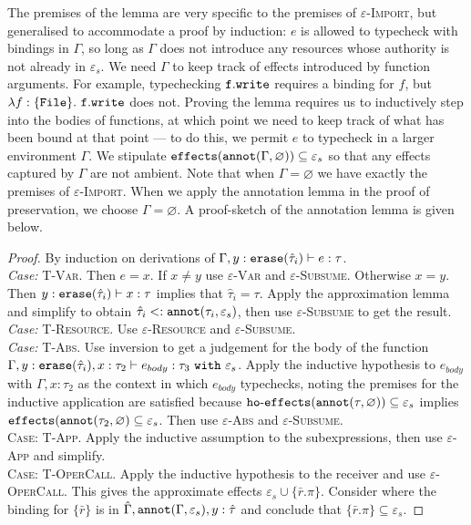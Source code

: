 The premises of the lemma are very specific to the premises of \textsc{$\varepsilon$-Import}, but generalised to accommodate a proof by induction: $e$ is allowed to typecheck with bindings in $\Gamma$, so long as $\Gamma$ does not introduce any resources whose authority is not already in $\varepsilon_s$. We need $\Gamma$ to keep track of effects introduced by function arguments. For example, typechecking $\mathtt{f.write}$ requires a binding for $f$, but $\lambda f: \{\mathtt{File}\}.~\mathtt{f.write}$ does not. Proving the lemma requires us to inductively step into the bodies of functions, at which point we need to keep track of what has been bound at that point --- to do this, we permit $e$ to typecheck in a larger environment $\Gamma$. We stipulate $\mathtt{effects}(\mathtt{annot}(\Gamma, \varnothing)) \subseteq \varepsilon_s$ so that any effects captured by $\Gamma$ are not ambient. Note that when $\Gamma = \varnothing$ we have exactly the premises of \textsc{$\varepsilon$-Import}. When we apply the annotation lemma in the proof of preservation, we choose $\Gamma = \varnothing$. A proof-sketch of the annotation lemma is given below.

\begin{proof}
By induction on derivations of $\Gamma, y: \mathtt{erase}(\hat \tau_i) \vdash e: \tau$.\\

\textit{Case:} \textsc{T-Var}. Then $e = x$. If $x \neq y$ use \textsc{$\varepsilon$-Var} and \textsc{$\varepsilon$-Subsume}. Otherwise $x = y$. Then $y: \mathtt{erase}(\hat \tau_i) \vdash x: \tau$ implies that $\hat \tau_i = \tau$. Apply the approximation lemma and simplify to obtain $\hat \tau_i <: \mathtt{annot}(\tau_i, \varepsilon_s)$, then use \textsc{$\varepsilon$-Subsume} to get the result.\\

\textit{Case:} \textsc{T-Resource}. Use \textsc{$\varepsilon$-Resource} and \textsc{$\varepsilon$-Subsume}.\\

\textit{Case:} \textsc{T-Abs}. Use inversion to get a judgement for the body of the function $\Gamma, y: \mathtt{erase}(\hat \tau_i), x: \tau_2 \vdash e_{body}: \tau_3~\mathtt{with}~ \varepsilon_s$. Apply the inductive hypothesis to $e_{body}$ with $\Gamma, x: \tau_2$ as the context in which $e_{body}$ typechecks, noting the premises for the inductive application are satisfied because $\mathtt{ho \hbox{-} effects}(\mathtt{annot}(\tau, \varnothing)) \subseteq \varepsilon_s$ implies $\mathtt{effects}(\mathtt{annot}(\tau_2, \varnothing) \subseteq \varepsilon_s$. Then use \textsc{$\varepsilon$-Abs} and \textsc{$\varepsilon$-Subsume}.	\\

\textsc{Case:} \textsc{T-App}. Apply the inductive assumption to the subexpressions, then use \textsc{$\varepsilon$-App} and simplify.\\

\textsc{Case:} \textsc{T-OperCall}. Apply the inductive hypothesis to the receiver and use \textsc{$\varepsilon$-OperCall}. This gives the approximate effects $\varepsilon_s \cup \{ \bar r.\pi \}$. Consider where the binding for $\{ \bar r \}$ is in $\hat \Gamma, \mathtt{annot}(\Gamma, \varepsilon_s), y: \hat \tau$ and conclude that $\{ \bar r.\pi \} \subseteq \varepsilon_s$.
\end{proof}

